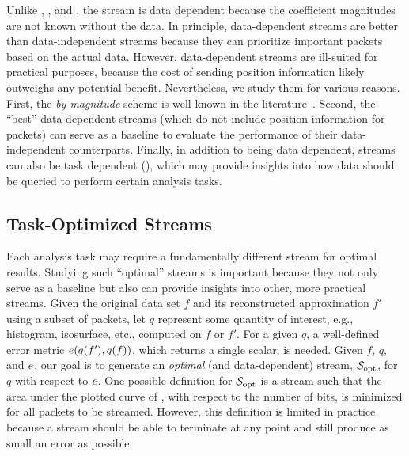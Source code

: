 Unlike \slvl, \sbit, and \swav, the \smag stream is data dependent because the coefficient
magnitudes are not known without the data.
%
In principle, data-dependent streams are better than data-independent streams because they can
prioritize important packets based on the actual data. However, data-dependent streams are
ill-suited for practical purposes, because the cost of sending position information likely outweighs
any potential benefit. Nevertheless, we study them for various reasons. First, the \emph{by
magnitude} scheme is well known in the literature~\cite{vapor2007}. Second, the ``best''
data-dependent streams (which do not include position information for packets) can serve as a
baseline to evaluate the performance of their data-independent counterparts. Finally, in addition to
being data dependent, streams can also be task dependent (), which may
provide insights into how data should be queried to perform certain analysis tasks.

\subsection{Task-Optimized Streams} \label{sec:data_dep_streams}

Each analysis task may require a fundamentally different stream for optimal results. Studying such
``optimal'' streams is important because they not only serve as a baseline but also can provide
insights into other, more practical streams. Given the original data set $f$ and its reconstructed
approximation $f'$ using a subset of packets, let $q$ represent some quantity of interest, e.g.,
histogram, isosurface, etc., computed on $f$ or $f'$. For a given $q$, a well-defined error metric
$e(q(f'),q(f))$, which returns a single scalar, is needed. Given $f$, $q$, and $e$, our goal
is to generate an \emph{optimal} (and data-dependent) stream, $\sopt$, for $q$ with respect to
$e$. One possible definition for $\sopt$ is a stream such that the area under the plotted curve
of \err, with respect to the number of bits, is minimized for all packets to be streamed. However,
this definition is limited in practice because a stream should be able to terminate at any point and
still produce as small an error as possible.

